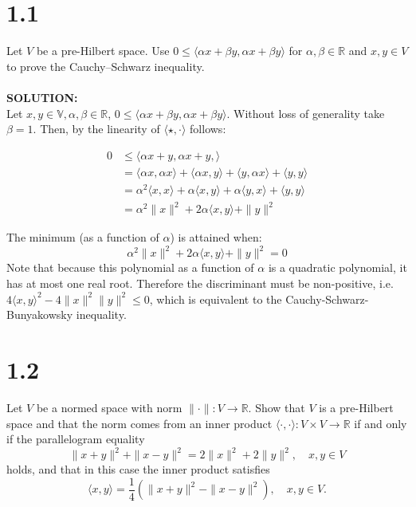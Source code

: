 \documentclass{article}
\begin{document}
\section*{1.1}
Let $V$ be a pre-Hilbert space. Use $0 \leq \langle \alpha x + \beta y, \alpha x + \beta y \rangle$ for $\alpha, \beta \in \mathbb{R}$ and $x, y \in V$ to prove the Cauchy–Schwarz inequality.
\\
\\
\noindent \textbf{SOLUTION: }\\

\noindent Let $x, y \in \mathbb{V}, \alpha, \beta \in \mathbb{R}$, $0 \leq \langle \alpha x + \beta y ,\alpha x + \beta y  \rangle$. Without loss of generality 
take $\beta = 1$. Then, by the linearity of $\langle \star, \cdot \rangle$ follows:

\begin{align*}
    0 &\leq \langle \alpha x + y, \alpha x + y,\rangle \\
    &= \langle \alpha x, \alpha x \rangle + \langle \alpha x, y \rangle + \langle y, \alpha x \rangle + \langle y, y \rangle \\
    &= \alpha^2 \langle x, x \rangle + \alpha \langle x, y \rangle + \alpha \langle y, x \rangle + \langle y, y \rangle \\
    &= \alpha^2 \| x \|^2 + 2 \alpha \langle x, y \rangle + \| y \|^2
\end{align*}

\noindent The minimum (as a function of $\alpha$) is attained when:
\[ 
    \alpha^2 \| x \|^2 + 2 \alpha \langle x, y \rangle + \| y \|^2 = 0
\] Note that because this polynomial as a function of $\alpha$ is a quadratic polynomial, it has at most one real root. Therefore 
the discriminant must be non-positive, i.e. $4\langle x, y \rangle^2 - 4 \| x \|^2 \| y \|^2 \leq 0$, which is equivalent to
the Cauchy-Schwarz-Bunyakowsky inequality.

\section*{1.2}
Let $V$ be a normed space with norm $\| \cdot \| : V \to \mathbb{R}$. Show that $V$ is a pre-Hilbert space and that the norm comes from an inner product $\langle \cdot, \cdot \rangle : V \times V \to \mathbb{R}$ if and only if the parallelogram equality
\[
\|x + y\|^2 + \|x - y\|^2 = 2\|x\|^2 + 2\|y\|^2, \quad x, y \in V
\]
holds, and that in this case the inner product satisfies
\[
\langle x, y \rangle = \frac{1}{4} \left( \|x + y\|^2 - \|x - y\|^2 \right), \quad x, y \in V.
\]
\end{document}
